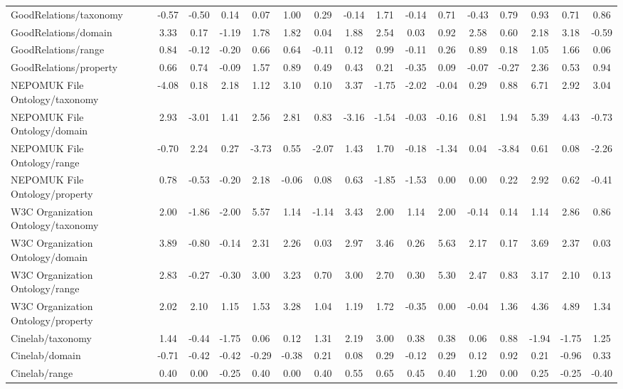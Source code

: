 \begin{tabular}{lccccccccccccccc}
GoodRelations/taxonomy & -0.57 & -0.50 & 0.14 & 0.07 & 1.00 & 0.29 & -0.14 & 1.71 & -0.14 & 0.71 & -0.43 & 0.79 & 0.93 & 0.71 & 0.86 \\
GoodRelations/domain & 3.33 & 0.17 & -1.19 & 1.78 & 1.82 & 0.04 & 1.88 & 2.54 & 0.03 & 0.92 & 2.58 & 0.60 & 2.18 & 3.18 & -0.59 \\
GoodRelations/range & 0.84 & -0.12 & -0.20 & 0.66 & 0.64 & -0.11 & 0.12 & 0.99 & -0.11 & 0.26 & 0.89 & 0.18 & 1.05 & 1.66 & 0.06 \\
GoodRelations/property & 0.66 & 0.74 & -0.09 & 1.57 & 0.89 & 0.49 & 0.43 & 0.21 & -0.35 & 0.09 & -0.07 & -0.27 & 2.36 & 0.53 & 0.94 \\
NEPOMUK File Ontology/taxonomy & -4.08 & 0.18 & 2.18 & 1.12 & 3.10 & 0.10 & 3.37 & -1.75 & -2.02 & -0.04 & 0.29 & 0.88 & 6.71 & 2.92 & 3.04 \\
NEPOMUK File Ontology/domain & 2.93 & -3.01 & 1.41 & 2.56 & 2.81 & 0.83 & -3.16 & -1.54 & -0.03 & -0.16 & 0.81 & 1.94 & 5.39 & 4.43 & -0.73 \\
NEPOMUK File Ontology/range & -0.70 & 2.24 & 0.27 & -3.73 & 0.55 & -2.07 & 1.43 & 1.70 & -0.18 & -1.34 & 0.04 & -3.84 & 0.61 & 0.08 & -2.26 \\
NEPOMUK File Ontology/property & 0.78 & -0.53 & -0.20 & 2.18 & -0.06 & 0.08 & 0.63 & -1.85 & -1.53 & 0.00 & 0.00 & 0.22 & 2.92 & 0.62 & -0.41 \\
W3C Organization Ontology/taxonomy & 2.00 & -1.86 & -2.00 & 5.57 & 1.14 & -1.14 & 3.43 & 2.00 & 1.14 & 2.00 & -0.14 & 0.14 & 1.14 & 2.86 & 0.86 \\
W3C Organization Ontology/domain & 3.89 & -0.80 & -0.14 & 2.31 & 2.26 & 0.03 & 2.97 & 3.46 & 0.26 & 5.63 & 2.17 & 0.17 & 3.69 & 2.37 & 0.03 \\
W3C Organization Ontology/range & 2.83 & -0.27 & -0.30 & 3.00 & 3.23 & 0.70 & 3.00 & 2.70 & 0.30 & 5.30 & 2.47 & 0.83 & 3.17 & 2.10 & 0.13 \\
W3C Organization Ontology/property & 2.02 & 2.10 & 1.15 & 1.53 & 3.28 & 1.04 & 1.19 & 1.72 & -0.35 & 0.00 & -0.04 & 1.36 & 4.36 & 4.89 & 1.34 \\
Cinelab/taxonomy & 1.44 & -0.44 & -1.75 & 0.06 & 0.12 & 1.31 & 2.19 & 3.00 & 0.38 & 0.38 & 0.06 & 0.88 & -1.94 & -1.75 & 1.25 \\
Cinelab/domain & -0.71 & -0.42 & -0.42 & -0.29 & -0.38 & 0.21 & 0.08 & 0.29 & -0.12 & 0.29 & 0.12 & 0.92 & 0.21 & -0.96 & 0.33 \\
Cinelab/range & 0.40 & 0.00 & -0.25 & 0.40 & 0.00 & 0.40 & 0.55 & 0.65 & 0.45 & 0.40 & 1.20 & 0.00 & 0.25 & -0.25 & -0.40 \\

\end{tabular}
